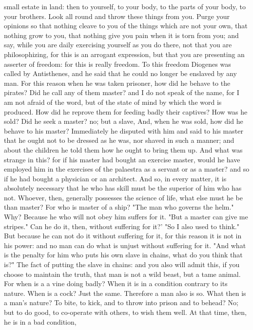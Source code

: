 \documentclass[a4paper]{article}
\begin{document}
small estate in land: then to yourself, to your body, to the parts of your
body, to your brothers. Look all round and throw these things from you. Purge
your opinions so that nothing cleave to you of the things which are not your
own, that nothing grow to you, that nothing give you pain when it is torn from
you; and say, while you are daily exercising yourself as you do there, not that
you are philosophizing, for this is an arrogant expression, but that you are
presenting an asserter of freedom: for this is really freedom. To this freedom
Diogenes was called by Antisthenes, and he said that he could no longer be
enslaved by any man. For this reason when he was taken prisoner, how did he
behave to the pirates? Did he call any of them master? and I do not speak of
the name, for I am not afraid of the word, but of the state of mind by which
the word is produced. How did he reprove them for feeding badly their captives?
How was he sold? Did he seek a master? no; but a slave, And, when he was sold,
how did he behave to his master? Immediately he disputed with him and said to
his master that he ought not to be dressed as he was, nor shaved in such a
manner; and about the children he told them how he ought to bring them up. And
what was strange in this? for if his master had bought an exercise master,
would he have employed him in the exercises of the palaestra as a servant or as
a master? and so if he had bought a physician or an architect. And so, in every
matter, it is absolutely necessary that he who has skill must be the superior
of him who has not. Whoever, then, generally possesses the science of life,
what else must he be than master? For who is master of a ship? "The man who
governs the helm." Why? Because he who will not obey him suffers for it. "But a
master can give me stripes." Can he do it, then, without suffering for it?' "So
I also used to think." But because he can not do it without suffering for it,
for this reason it is not in his power: and no man can do what is unjust
without suffering for it. "And what is the penalty for him who puts his own
slave in chains, what do you think that is?" The fact of putting the slave in
chains: and you also will admit this, if you choose to maintain the truth, that
man is not a wild beast, but a tame animal. For when is a a vine doing badly?
When it is in a condition contrary to its nature. When is a cock? Just the
same. Therefore a man also is so. What then is a man's nature? To bite, to
kick, and to throw into prison and to behead? No; but to do good, to co-operate
with others, to wish them well. At that time, then, he is in a bad condition,
\end{document}
